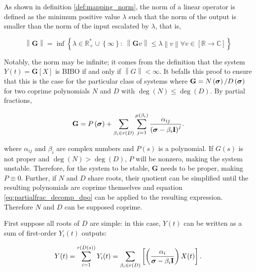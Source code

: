 	As shown in definition \ref{def:mapping_norm}, the norm of a linear operator is defined as the minimum positive value $\lambda$ such that the norm of the output is smaller than the norm of the input escalated by $\lambda$, that is,

\begin{equation} \left\lVert\mathbf{G}\right\rVert = \inf\left\{\lambda\in\mathbb{R}_+^*\cup\left\{\infty\right\}:\ \left\lVert \mathbf{G}v\right\rVert\leq \lambda\left\lVert v\right\rVert\forall v\in \left[\mathbb{R}\to\mathbb{C} \right] \right\}\end{equation}

	Notably, the norm may be infinite; it comes from the definition that the system $Y(t) = \mathbf{G}\left[X\right]$ is BIBO if and only if $\left\lVert G\right\rVert < \infty$. It befalls this proof to ensure that this is the case for the particular class of systems where $\mathbf{G} = N\left(\boldsymbol{\sigma}\right)/D\left(\boldsymbol{\sigma}\right)$ for two coprime polynomials $N$ and $D$ with $\deg(N) \leq \deg(D)$. By partial fractions,

\begin{equation} \mathbf{G} = P\left(\boldsymbol{\sigma}\right) + \sum\limits_{\beta_i\in r\left(D\right)} \sum\limits_{j=1}^{\mu\left(\beta_i\right)} \dfrac{\alpha_{ij}}{\left(\boldsymbol{\sigma} - \beta_i\mathbf{I}\right)^j}. \label{eq:partialfrac_decomp_dpo}\end{equation}

	\noindent where $\alpha_{ij}$ and $\beta_i$ are complex numbers and $P(s)$ is a polynomial. If $G(s)$ is not proper and $\deg\left(N\right) > \deg\left(D\right)$, $P$ will be nonzero, making the system unstable. Therefore, for the system to be stable, $\mathbf{G}$ needs to be proper, making $P\equiv 0$. Further, if $N$ and $D$ share roots, their quotient can be simplified until the resulting polynomials are coprime themselves and equation \eqref{eq:partialfrac_decomp_dpo} can be applied to the resulting expression. Therefore $N$ and $D$ can be supposed coprime. 
	
	First suppose all roots of $D$ are simple: in this case, $Y(t)$ can be written as a sum of first-order $Y_i(t)$ outputs:

\begin{equation} Y(t) = \sum\limits_{i=1}^{r\left(D(s)\right)} Y_i(t) = \sum\limits_{\beta_i\in r\left(D\right)} \left[\left(\dfrac{\alpha_{i}}{\boldsymbol{\sigma} - \beta_i\mathbf{I}}\right) X(t)\right]. \label{eq:partialfrac_decomp_dpo}\end{equation}

